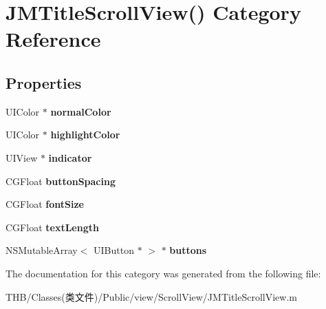 \hypertarget{category_j_m_title_scroll_view_07_08}{}\section{J\+M\+Title\+Scroll\+View() Category Reference}
\label{category_j_m_title_scroll_view_07_08}
\subsection*{Properties}
\begin{DoxyCompactItemize}
\item 
\mbox{\label{category_j_m_title_scroll_view_07_08_a7e7e989d8eac0cfbe57d8d64f119a78d}} 
U\+I\+Color $\ast$ {\bfseries normal\+Color}
\item 
\mbox{\label{category_j_m_title_scroll_view_07_08_aefb0b97e8824675f99d655c19bc17b2c}} 
U\+I\+Color $\ast$ {\bfseries highlight\+Color}
\item 
\mbox{\label{category_j_m_title_scroll_view_07_08_a84ddafb64e6ac00677ff0fd99fbaeda5}} 
U\+I\+View $\ast$ {\bfseries indicator}
\item 
\mbox{\label{category_j_m_title_scroll_view_07_08_a3edb86fc5c4b0ade4d699567281b3c59}} 
C\+G\+Float {\bfseries button\+Spacing}
\item 
\mbox{\label{category_j_m_title_scroll_view_07_08_a105fa1b3f4e1f13b83b29c109a6ae790}} 
C\+G\+Float {\bfseries font\+Size}
\item 
\mbox{\label{category_j_m_title_scroll_view_07_08_a3ed8a51bd6116e24bd228c03c8e07bc2}} 
C\+G\+Float {\bfseries text\+Length}
\item 
\mbox{\label{category_j_m_title_scroll_view_07_08_ad944617ba178c91be79853c7198a15f4}} 
N\+S\+Mutable\+Array$<$ U\+I\+Button $\ast$ $>$ $\ast$ {\bfseries buttons}
\end{DoxyCompactItemize}


The documentation for this category was generated from the following file\+:\begin{DoxyCompactItemize}
\item 
T\+H\+B/\+Classes(类文件)/\+Public/view/\+Scroll\+View/J\+M\+Title\+Scroll\+View.\+m\end{DoxyCompactItemize}
